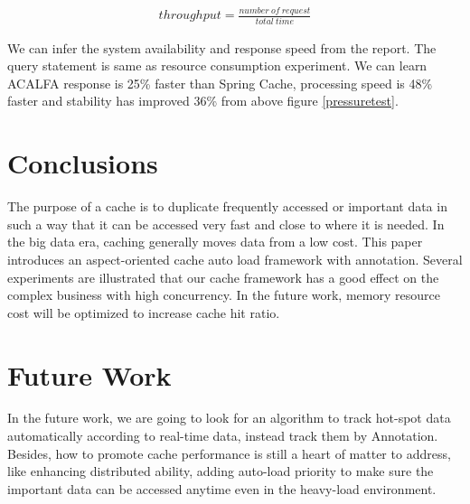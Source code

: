 \documentclass{singlecol-new}
\theoremstyle{TH}{
\newtheorem{lemma}{Lemma}
\newtheorem{theorem}[lemma]{Theorem}
\newtheorem{corrolary}[lemma]{Corrolary}
\newtheorem{conjecture}[lemma]{Conjecture}
\newtheorem{proposition}[lemma]{Proposition}
\newtheorem{claim}[lemma]{Claim}
\newtheorem{stheorem}[lemma]{Wrong Theorem}
}
\theoremstyle{THrm}{
\newtheorem{definition}{Definition}[section]
\newtheorem{question}{Question}[section]
\newtheorem{remark}{Remark}
\newtheorem{scheme}{Scheme}
}
\theoremstyle{THhit}{
\newtheorem{case}{Case}[section]
}
\begin{document}
\begin{center}
\begin{eqnarray}
    \label{throughput}
    throughput = \frac{number\ of\ request}{total\ time}
\end{eqnarray}
\end{center}
 
 We can infer the system availability and response speed from the report. The query statement is same as resource consumption experiment. We can learn ACALFA response is 25\% faster than Spring Cache, processing speed is 48\% faster and stability has improved 36\% from above figure \ref{pressuretest}.

\section{Conclusions}
\label{Conclusions}

The purpose of a cache is to duplicate frequently accessed or important data in such a way that it can be accessed very fast and close to where it is needed. In the big data era, caching generally moves data from a low cost. This paper introduces an aspect-oriented cache auto load framework with annotation. Several experiments are illustrated that our cache framework has a good effect on the complex business with high concurrency. In the future work, memory resource cost will be optimized to increase cache hit ratio.

\section{Future Work}
\label{futurework}

In the future work, we are going to look for an algorithm to track hot-spot data automatically according to real-time data, instead track them by Annotation. Besides, how to promote cache performance is still a heart of matter to address, like enhancing distributed ability, adding auto-load priority to make sure the important data can be accessed anytime even in the heavy-load environment.





%
%
%



\end{document}
